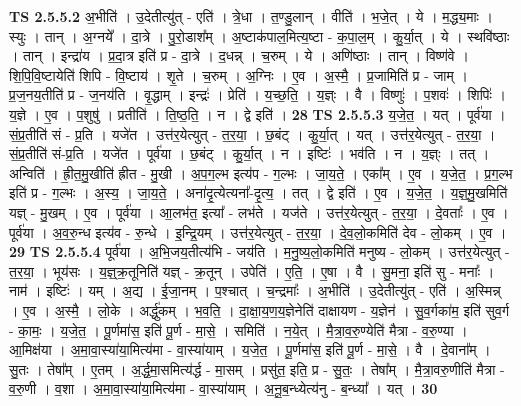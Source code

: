 \documentclass[17pt]{extarticle}
\begin{document}
                  \newline
                                \textbf{ TS 2.5.5.2} \newline
                  अ॒भीति॑ । उ॒देतीत्यु॑त् - एति॑ । त्रे॒धा । त॒ण्डु॒लान् । वीति॑ । भ॒जे॒त् । ये । म॒द्ध्य॒माः । स्युः । तान् । अ॒ग्नये᳚ । दा॒त्रे । पु॒रो॒डाश᳚म् । अ॒ष्टाक॑पाल॒मित्य॒ष्टा - क॒पा॒ल॒म् । कु॒र्या॒त् । ये । स्थवि॑ष्ठाः । तान् । इन्द्रा॑य । प्र॒दा॒त्र इति॑ प्र - दा॒त्रे । द॒धन्न् । च॒रुम् । ये । अणि॑ष्ठाः । तान् । विष्ण॑वे । शि॒पि॒वि॒ष्टायेति॑ शिपि - वि॒ष्टाय॑ । शृ॒ते । च॒रुम् । अ॒ग्निः । ए॒व । अ॒स्मै॒ । प्र॒जामिति॑ प्र - जाम् । प्र॒ज॒नय॒तीति॑ प्र - ज॒नय॑ति । वृ॒द्धाम् । इन्द्रः॑ । प्रेति॑ । य॒च्छ॒ति॒ । य॒ज्ञ्ः । वै । विष्णुः॑ । प॒शवः॑ । शिपिः॑ । य॒ज्ञे । ए॒व । प॒शुषु॑ । प्रतीति॑ । ति॒ष्ठ॒ति॒ । न । द्वे इति॑ । \textbf{  28} \newline
                  \newline
                                \textbf{ TS 2.5.5.3} \newline
                  य॒जे॒त॒ । यत् । पूर्व॑या । सं॒प्र॒तीति॑ सं - प्र॒ति । यजे॑त । उत्त॑र॒येत्युत् - त॒र॒या॒ । छ॒बंट् । कु॒र्या॒त् । यत् । उत्त॑र॒येत्युत् - त॒र॒या॒ । सं॒प्र॒तीति॑ सं-प्र॒ति । यजे॑त । पूर्व॑या । छ॒बंट् । कु॒र्या॒त् । न । इष्टिः॑ । भव॑ति । न । य॒ज्ञ्ः । तत् । अन्विति॑ । ह्री॒त॒मु॒खीति॑ ह्रीत - मु॒खी । अ॒प॒ग॒ल्भ इत्य॑प - ग॒ल्भः । जा॒य॒ते॒ । एका᳚म् । ए॒व । य॒जे॒त॒ । प्र॒ग॒ल्भ इति॑ प्र - ग॒ल्भः । अ॒स्य॒ । जा॒य॒ते॒ । अना॑दृ॒त्येत्यना᳚-दृ॒त्य॒ । तत् । द्वे इति॑ । ए॒व । य॒जे॒त॒ । य॒ज्ञ्॒मु॒खमिति॑ यज्ञ् - मु॒खम् । ए॒व । पूर्व॑या । आ॒लभ॑त॒ इत्या᳚ - लभ॑ते । यज॑ते । उत्त॑र॒येत्युत् - त॒र॒या॒ । दे॒वताः᳚ । ए॒व । पूर्व॑या । अ॒व॒रु॒न्ध इत्य॑व - रु॒न्धे । इ॒न्द्रि॒यम् । उत्त॑र॒येत्युत् - त॒र॒या॒ । दे॒व॒लो॒कमिति॑ देव - लो॒कम् । ए॒व । \textbf{  29} \newline
                  \newline
                                \textbf{ TS 2.5.5.4} \newline
                  पूर्व॑या । अ॒भि॒जय॒तीत्य॑भि - जय॑ति । म॒नु॒ष्य॒लो॒कमिति॑ मनुष्य - लो॒कम् । उत्त॑र॒येत्युत् - त॒र॒या॒ । भूय॑सः । य॒ज्ञ्॒क्र॒तूनिति॑ यज्ञ् - क्र॒तून् । उपेति॑ । ए॒ति॒ । ए॒षा । वै । सु॒मना॒ इति॑ सु - मनाः᳚ । नाम॑ । इष्टिः॑ । यम् । अ॒द्य । ई॒जा॒नम् । प॒श्चात् । च॒न्द्रमाः᳚ । अ॒भीति॑ । उ॒देतीत्यु॑त् - एति॑ । अ॒स्मिन्न् । ए॒व । अ॒स्मै॒ । लो॒के । अर्द्धु॑कम् । भ॒व॒ति॒ । दा॒क्षा॒य॒ण॒य॒ज्ञेनेति॑ दाक्षायण - य॒ज्ञेन॑ । सु॒व॒र्गका॑म॒ इति॑ सुव॒र्ग - का॒मः॒ । य॒जे॒त॒ । पू॒र्णमा॑स॒ इति॑ पू॒र्ण - मा॒से॒ । समिति॑ । न॒ये॒त् । मै॒त्रा॒व॒रु॒ण्येति॑ मैत्रा - व॒रु॒ण्या । आ॒मिक्ष॑या । अ॒मा॒वा॒स्या॑या॒मित्य॑मा - वा॒स्या॑याम् । य॒जे॒त॒ । पू॒र्णमा॑स॒ इति॑ पू॒र्ण - मा॒से॒ । वै । दे॒वाना᳚म् । सु॒तः । तेषा᳚म् । ए॒तम् । अ॒र्द्ध॒मा॒समित्य॑र्द्ध - मा॒सम् । प्रसु॑त॒ इति॒ प्र - सु॒तः॒ । तेषा᳚म् । मै॒त्रा॒वरु॒णीति॑ मैत्रा - व॒रु॒णी । व॒शा । अ॒मा॒वा॒स्या॑या॒मित्य॑मा - वा॒स्या॑याम् । अ॒नू॒ब॒न्ध्येत्य॑नु - ब॒न्ध्या᳚ । यत् । \textbf{  30} \newline
\end{document}
